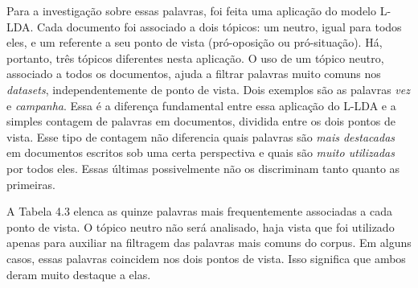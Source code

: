 Para a investigação sobre essas palavras, foi feita uma aplicação do modelo L-LDA. Cada documento foi associado a dois tópicos: um neutro, igual para todos eles, e um referente a seu ponto de vista (pró-oposição ou pró-situação). Há, portanto, três tópicos diferentes nesta aplicação. O uso de um tópico neutro, associado a todos os documentos, ajuda a filtrar palavras muito comuns nos \emph{datasets}, independentemente de ponto de vista. Dois exemplos são as palavras \emph{vez} e \emph{campanha}. Essa é a diferença fundamental entre essa aplicação do L-LDA e a simples contagem de palavras em documentos, dividida entre os dois pontos de vista. Esse tipo de contagem não diferencia quais palavras são \emph{mais destacadas} em documentos escritos sob uma certa perspectiva e quais são \emph{muito utilizadas} por todos eles. Essas últimas possivelmente não os discriminam tanto quanto as primeiras.





A Tabela 4.3 elenca as quinze palavras mais frequentemente associadas a cada ponto de vista. O tópico neutro não será analisado, haja vista que foi utilizado apenas para auxiliar na filtragem das palavras mais comuns do corpus. Em alguns casos, essas palavras coincidem nos dois pontos de vista. Isso significa que ambos deram muito destaque a elas.



